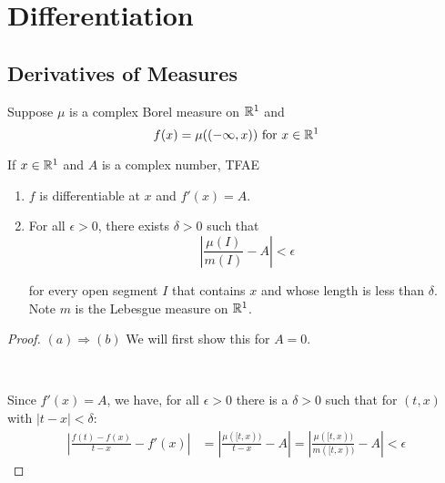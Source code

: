 

    
\section{Differentiation}

\subsection{Derivatives of Measures}
\begin{theorem}
    Suppose $\mu$ is a complex Borel measure on $\mathbb{R}^1$ and \begin{equation}
        f(x) = \mu((-\infty, x)) \text{ for }x\in \mathbb{R}^1
    \end{equation}

    If $x\in \mathbb{R}^1$ and $A$ is a complex number, TFAE\begin{enumerate}[label = (\alph*)]
        \item $f$ is differentiable at $x$ and $f'(x) = A$.
        \item For all $\epsilon>0$, there exists $\delta>0$ such that\begin{equation}
            |\frac{\mu(I)}{m(I)}-A|<\epsilon
        \end{equation}

        for every open segment $I$ that contains $x$ and whose length is less than $\delta$. Note $m$ is the Lebesgue measure on $\mathbb{R}^1$.
    \end{enumerate}

    \begin{proof}
        $(a)\Rightarrow (b)$ 
        We will first show this for $A = 0$. 

        \
        
        Since $f'(x) = A$, we have, for all $\epsilon>0$ there is a $\delta>0$ such that for $(t,x)$ with $|t-x|<\delta$:\begin{align*}
            |\frac{f(t)-f(x)}{t-x} - f'(x)| &= |\frac{\mu([t,x))}{t-x} - A| = |\frac{\mu([t,x))}{m([t,x))} - A| <\epsilon
        \end{align*}
    \end{proof}
\end{theorem}
